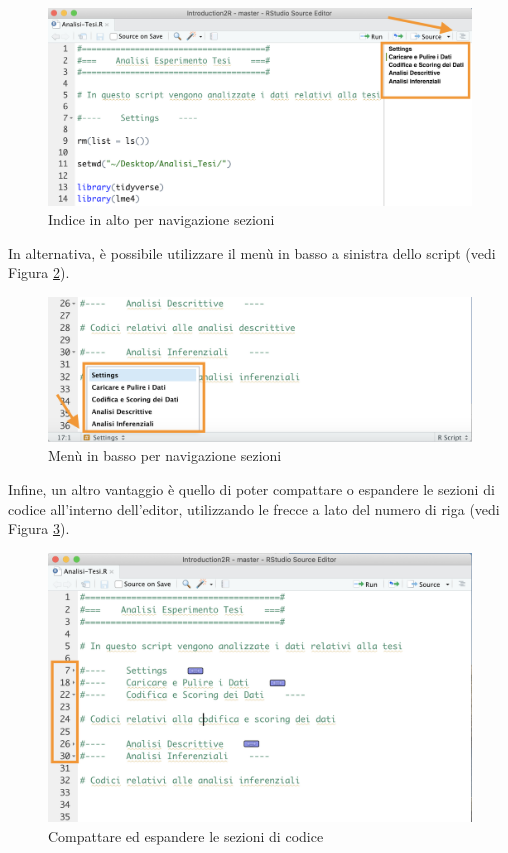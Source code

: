 \documentclass[
]{book}
\begin{document}
\begin{figure}

{\centering \includegraphics[width=0.85\linewidth]{images/toc-side} 

}

\caption{Indice in alto per navigazione sezioni}\label{fig:toc-side}
\end{figure}

In alternativa, è possibile utilizzare il menù in basso a sinistra dello script (vedi Figura \ref{fig:toc-bottom}).

\begin{figure}

{\centering \includegraphics[width=0.85\linewidth]{images/toc-bottom} 

}

\caption{Menù in basso per navigazione sezioni}\label{fig:toc-bottom}
\end{figure}

Infine, un altro vantaggio è quello di poter compattare o espandere le sezioni di codice all'interno dell'editor, utilizzando le frecce a lato del numero di riga (vedi Figura \ref{fig:section-closed}).

\begin{figure}

{\centering \includegraphics[width=0.85\linewidth]{images/section-closed} 

}

\caption{Compattare ed espandere le sezioni di codice}\label{fig:section-closed}
\end{figure}
\end{document}
